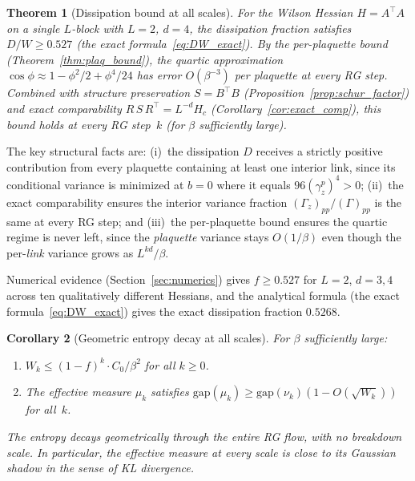 \documentclass[11pt]{article}
\newtheorem{theorem}{Theorem}[section]
\newtheorem{corollary}[theorem]{Corollary}
\theoremstyle{definition}
\newcommand{\gap}{\mathrm{gap}}
\begin{document}
\begin{theorem}[Dissipation bound at all scales]\label{thm:diss}
For the Wilson Hessian $H = A^\top A$ on a single $L$-block with 
$L = 2$, $d = 4$, the dissipation fraction satisfies 
$D/W \geq 0.527$ (the exact formula~\eqref{eq:DW_exact}).  
By the per-plaquette bound (Theorem~\ref{thm:plaq_bound}), the 
quartic approximation $\cos\phi \approx 1 - \phi^2/2 + \phi^4/24$ 
has error $O(\beta^{-3})$ per plaquette at \emph{every} RG step.
Combined with structure preservation $S = B^\top B$ 
(Proposition~\ref{prop:schur_factor}) and exact comparability 
$R\,S\,R^\top = L^{-d}H_c$ (Corollary~\ref{cor:exact_comp}), 
this bound holds at every RG step~$k$ (for $\beta$ sufficiently large).
\end{theorem}

The key structural facts are: (i)~the dissipation $D$ receives a 
strictly positive contribution from every plaquette containing at 
least one interior link, since its conditional variance is minimized 
at $b = 0$ where it equals $96(\gamma_z^p)^4 > 0$; (ii)~the 
exact comparability ensures the interior variance fraction 
$(\Gamma_z)_{pp}/(\Gamma)_{pp}$ is the same at every RG step; and 
(iii)~the per-plaquette bound ensures the quartic regime is never 
left, since the \emph{plaquette} variance stays $O(1/\beta)$ even 
though the per-\emph{link} variance grows as $L^{kd}/\beta$.

Numerical evidence (Section~\ref{sec:numerics}) gives $f \geq 0.527$ 
for $L = 2$, $d = 3, 4$ across ten qualitatively different Hessians, 
and the analytical formula (the exact formula~\eqref{eq:DW_exact}) gives the 
exact dissipation fraction $0.5268$.

\begin{corollary}[Geometric entropy decay at all scales]\label{cor:gap}
For $\beta$ sufficiently large:
\begin{enumerate}
\item $W_k \leq (1 - f)^k \cdot C_0/\beta^2$ for all $k \geq 0$.
\item The effective measure $\mu_k$ satisfies 
  $\gap(\mu_k) \geq \gap(\nu_k)(1 - O(\sqrt{W_k}))$ for all~$k$.
\end{enumerate}
The entropy decays geometrically through the \emph{entire} RG flow, 
with no breakdown scale.  In particular, the effective measure at 
every scale is close to its Gaussian shadow in the sense of KL divergence.
\end{corollary}
\end{document}
